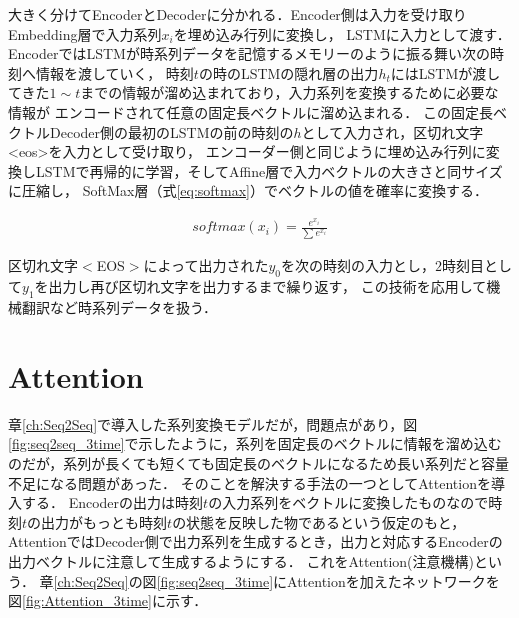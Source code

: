 \documentclass[a4j,11pt,report]{jsbook}
\begin{document}
大きく分けてEncoderとDecoderに分かれる．Encoder側は入力を受け取りEmbedding層で入力系列$x_{i}$を埋め込み行列に変換し，
LSTMに入力として渡す．EncoderではLSTMが時系列データを記憶するメモリーのように振る舞い次の時刻へ情報を渡していく，
時刻$t$の時のLSTMの隠れ層の出力$h_{t}$にはLSTMが渡してきた$1 \sim t$までの情報が溜め込まれており，入力系列を変換するために必要な情報が
エンコードされて任意の固定長ベクトルに溜め込まれる．
この固定長ベクトルDecoder側の最初のLSTMの前の時刻の$h$として入力され，区切れ文字<eos>を入力として受け取り，
エンコーダー側と同じように埋め込み行列に変換しLSTMで再帰的に学習，そしてAffine層で入力ベクトルの大きさと同サイズに圧縮し，
SoftMax層（式\ref{eq:softmax}）でベクトルの値を確率に変換する．

\begin{equation}
  \label{eq:softmax}
  \begin{split}
    softmax(x_{i}) = \frac{ e^{x_{i}} }{ \sum e^{x_{i}} }
  \end{split}
\end{equation}

区切れ文字$<$EOS$>$によって出力された$y_{0}$を次の時刻の入力とし，$2$時刻目として$y_{1}$を出力し再び区切れ文字を出力するまで繰り返す，
この技術を応用して機械翻訳など時系列データを扱う．

\chapter{Attention\label{ch:attention} }
章\ref{ch:Seq2Seq}で導入した系列変換モデルだが，問題点があり，図\ref{fig:seq2seq_3time}で示したように，系列を固定長のベクトルに情報を溜め込むのだが，系列が長くても短くても固定長のベクトルになるため長い系列だと容量不足になる問題があった．
そのことを解決する手法の一つとしてAttentionを導入する．
Encoderの出力は時刻$t$の入力系列をベクトルに変換したものなので時刻$t$の出力がもっとも時刻$t$の状態を反映した物であるという仮定のもと，
AttentionではDecoder側で出力系列を生成するとき，出力と対応するEncoderの出力ベクトルに注意して生成するようにする．
これをAttention(注意機構)という．
章\ref{ch:Seq2Seq}の図\ref{fig:seq2seq_3time}にAttentionを加えたネットワークを図\ref{fig:Attention_3time}に示す．
\end{document}
